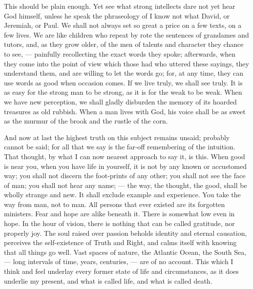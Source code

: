 \documentclass[12pt]{article}
\begin{document}
This should be plain enough. Yet see what strong intellects dare not yet
hear God himself, unless he speak the phraseology of I know not what David,
or Jeremiah, or Paul. We shall not always set so great a price on a few
texts, on a few lives. We are like children who repeat by rote the sentences
of grandames and tutors, and, as they grow older, of the men of talents and
character they chance to see, --- painfully recollecting the exact words they
spoke; afterwards, when they come into the point of view which those had who
uttered these sayings, they understand them, and are willing to let the
words go; for, at any time, they can use words as good when occasion comes.
If we live truly, we shall see truly. It is as easy for the strong man to be
strong, as it is for the weak to be weak. When we have new perception, we
shall gladly disburden the memory of its hoarded treasures as old rubbish.
When a man lives with God, his voice shall be as sweet as the murmur of the
brook and the rustle of the corn.

And now at last the highest truth on this subject remains unsaid; probably
cannot be said; for all that we say is the far-off remembering of the
intuition. That thought, by what I can now nearest approach to say it, is
this. When good is near you, when you have life in yourself, it is not by
any known or accustomed way; you shall not discern the foot-prints of any
other; you shall not see the face of man; you shall not hear any name; ---
the way, the thought, the good, shall be wholly strange and new. It shall
exclude example and experience. You take the way from man, not to man. All
persons that ever existed are its forgotten ministers. Fear and hope are
alike beneath it. There is somewhat low even in hope. In the hour of vision,
there is nothing that can be called gratitude, nor properly joy. The soul
raised over passion beholds identity and eternal causation, perceives the
self-existence of Truth and Right, and calms itself with knowing that all
things go well. Vast spaces of nature, the Atlantic Ocean, the South Sea, ---
long intervals of time, years, centuries, --- are of no account. This which I
think and feel underlay every former state of life and circumstances, as it
does underlie my present, and what is called life, and what is called death.
\end{document}
